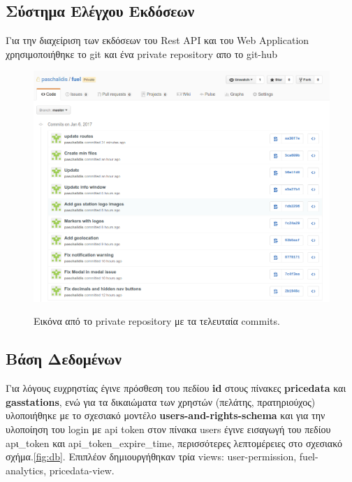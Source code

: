 \subsection{Σύστημα Ελέγχου Εκδόσεων}

Για την διαχείριση των εκδόσεων του Rest API και του Web Application χρησιμοποιήθηκε το git\footnotemark{} και ένα private repository απο το git-hub\footnotemark{}

\begin{figure}[H]
  \caption{Εικόνα από το private repository με τα τελευταία commits.}
  \centering
    \includegraphics[width=1\textwidth]{img/git.png}
    \label{fig:git}
\end{figure}

\subsection{Βάση Δεδομένων}
Για λόγους ευχρηστίας έγινε πρόσθεση του πεδίου \textbf{id} στους πίνακες \textbf{pricedata} και \textbf{gasstations}, ενώ για τα δικαιώματα των χρηστών (πελάτης, πρατηριούχος) υλοποιήθηκε με το σχεσιακό μοντέλο \textbf{users-and-rights-schema} και για την υλοποίηση του login με api token στον πίνακα users έγινε εισαγωγή του πεδίου apι\_token και api\_token\_expire\_time, περισσότερες λεπτομέρειες στο σχεσιακό σχήμα.\ref{fig:db}. Επιπλέον δημιουργήθηκαν τρία views: user-permission, fuel-analytics, pricedata-view.

